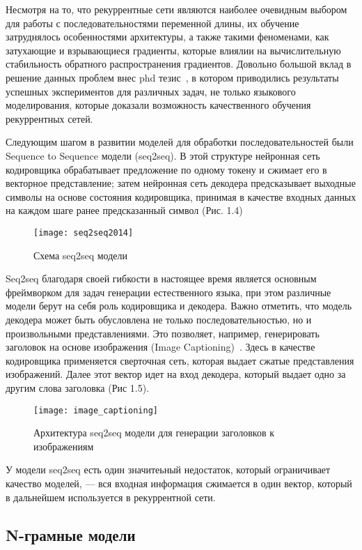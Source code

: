 Несмотря на то, что рекуррентные сети являются наиболее очевидным выбором для работы с последовательностями переменной длины, их обучение затруднялось особенностями архитектуры, а также такими феноменами, как затухающие и взрывающиеся градиенты, которые влиялии на вычислительную стабильность обратного распространения градиентов. Довольно большой вклад в решение данных проблем внес phd тезис~\cite{sutskever2013training}, в котором приводились результаты успешных экспериментов для различных задач, не только языкового моделирования, которые доказали возможность качественного обучения рекуррентных сетей.

Следующим шагом в развитии моделей для обработки последовательностей были Sequence to Sequence модели (seq2seq). В этой структуре нейронная сеть кодировщика обрабатывает предложение по одному токену и сжимает его в векторное представление; затем нейронная сеть декодера предсказывает выходные символы на основе состояния кодировщика, принимая в качестве входных данных на каждом шаге ранее предсказанный символ (Рис. 1.4)

\begin{figure}[ht]
	\centering
	\texttt{[image: seq2seq2014]}  
	\caption{ Схема seq2seq модели }
\end{figure}

Seq2seq благодаря своей гибкости в настоящее время является основным фреймворком для задач генерации естественного языка, при этом различные модели берут на себя роль кодировщика и декодера. Важно отметить, что модель декодера может быть обусловлена не только последовательностью, но и произвольными представлениями. Это позволяет, например, генерировать заголовок на основе изображения (Image Captioning)~\cite{image-captioning}. Здесь в качестве кодировщика применяется сверточная сеть, которая выдает сжатые представления изображений. Далее этот вектор идет на вход декодера, который выдает одно за другим слова заголовка (Рис 1.5).
\begin{figure}[ht]
	\centering
	\texttt{[image: image\_captioning]}  
	\caption{ Архитектура seq2seq модели для генерации заголовков к изображениям }
\end{figure}

У модели seq2seq есть один значитеьный недостаток, который ограничивает качество моделей, --- вся входная информация сжимается в один вектор, который в дальнейшем используется в рекуррентной сети. 

\subsection{N-грамные модели}
\label{sub:domain:n_gram}


